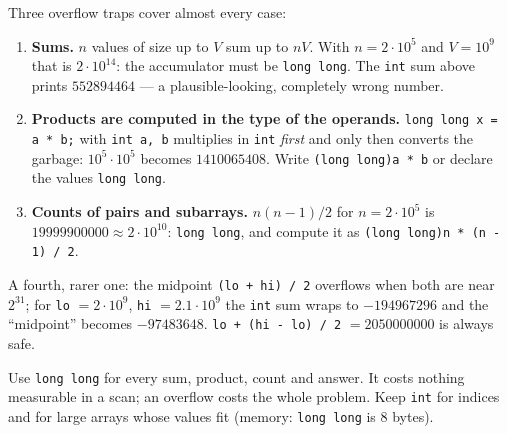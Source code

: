 \begin{diagrambox}
\end{diagrambox}

Three overflow traps cover almost every case:
\begin{enumerate}[leftmargin=*]
    \item \textbf{Sums.} $n$ values of size up to $V$ sum up to $nV$. With $n = 2\cdot10^5$ and $V = 10^9$ that is $2\cdot10^{14}$: the accumulator must be \texttt{long long}. The \texttt{int} sum above prints $552894464$ --- a plausible-looking, completely wrong number.
    \item \textbf{Products are computed in the type of the operands.} \texttt{long long x = a * b;} with \texttt{int a, b} multiplies in \texttt{int} \emph{first} and only then converts the garbage: $10^5 \cdot 10^5$ becomes $1410065408$. Write \texttt{(long long)a * b} or declare the values \texttt{long long}.
    \item \textbf{Counts of pairs and subarrays.} $n(n-1)/2$ for $n = 2\cdot10^5$ is $19999900000 \approx 2\cdot10^{10}$: \texttt{long long}, and compute it as \texttt{(long long)n * (n - 1) / 2}.
\end{enumerate}
A fourth, rarer one: the midpoint \texttt{(lo + hi) / 2} overflows when both are near $2^{31}$; for \texttt{lo} $= 2\cdot10^9$, \texttt{hi} $= 2.1\cdot10^9$ the \texttt{int} sum wraps to $-194967296$ and the ``midpoint'' becomes $-97483648$. \texttt{lo + (hi - lo) / 2} $= 2050000000$ is always safe.

\begin{insightbox}
Use \texttt{long long} for every sum, product, count and answer. It costs nothing measurable in a scan; an overflow costs the whole problem. Keep \texttt{int} for indices and for large arrays whose values fit (memory: \texttt{long long} is 8 bytes).
\end{insightbox}

